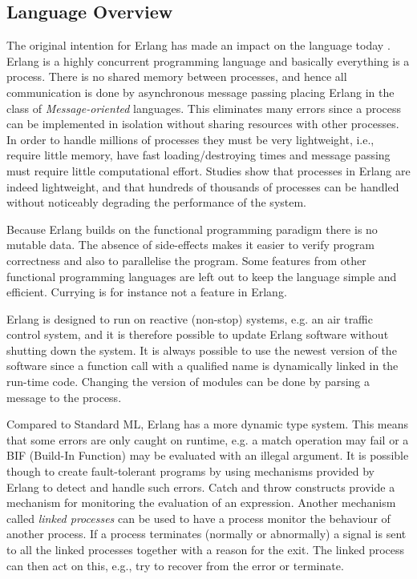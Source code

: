 \subsection{Language Overview}
The original intention for Erlang has made an impact on the language today \cite{RefWorks:76,RefWorks:77}. Erlang is a highly concurrent programming language and basically everything is a process. There is no shared memory between processes, and hence all communication is done by asynchronous message passing placing Erlang in the class of \emph{Message-oriented} languages. This eliminates many errors since a process can be implemented in isolation without sharing resources with other processes. In order to handle millions of processes they must be very lightweight, i.e., require little memory, have fast loading/destroying times and message passing must require little computational effort. Studies show \cite{RefWorks:74} that processes in Erlang are indeed lightweight, and that hundreds of thousands of processes can be handled without noticeably degrading the performance of the system. 

Because Erlang builds on the functional programming paradigm there is no mutable data. The absence of side-effects makes it easier to verify program correctness and also to parallelise the program. Some features from other functional programming languages are left out to keep the language simple and efficient. Currying is for instance not a feature in Erlang. 

Erlang is designed to run on reactive (non-stop) systems, e.g. an air traffic control system, and it is therefore possible to update Erlang software without shutting down the system. It is always possible to use the newest version of the software since a function call with a qualified name is dynamically linked in the run-time code. Changing the version of modules can be done by parsing a message to the process.

Compared to Standard ML, Erlang has a more dynamic type system. This means that some errors are only caught on runtime, e.g. a match operation may fail or a BIF (Build-In Function) may be evaluated with an illegal argument. It is possible though to create fault-tolerant programs by using mechanisms provided by Erlang to detect and handle such errors. Catch and throw constructs provide a mechanism for monitoring the evaluation of an expression. Another mechanism called \emph{linked processes} can be used to have a process monitor the behaviour of another process. If a process terminates (normally or abnormally) a signal is sent to all the linked processes together with a reason for the exit. The linked process can then act on this, e.g., try to recover from the error or terminate.
